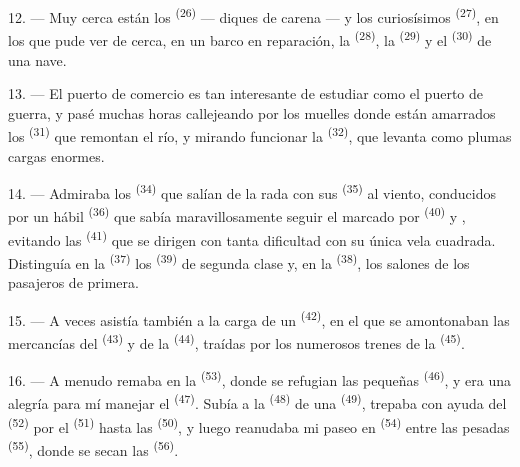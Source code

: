 12. --- Muy cerca están los  \textsuperscript{(26)} --- diques de
carena --- y los curiosísimos  \textsuperscript{(27)}, en
los que pude ver de cerca, en un barco en reparación, la 
\textsuperscript{(28)}, la  \textsuperscript{(29)} y el 
\textsuperscript{(30)} de una nave.

13. --- El puerto de comercio es tan interesante de estudiar como el
puerto de guerra, y pasé muchas horas callejeando por los muelles donde
están amarrados los  \textsuperscript{(31)} que remontan el
río, y mirando funcionar la  \textsuperscript{(32)}, que
levanta como plumas cargas enormes.

\VUsaut{4.0mm}
\VUsaut{3.0mm}

14. --- Admiraba los  \textsuperscript{(34)} que salían de la
rada con sus  \textsuperscript{(35)} al viento, conducidos por un
hábil  \textsuperscript{(36)} que sabía maravillosamente seguir el
 marcado por  \textsuperscript{(40)} y ,
evitando las  \textsuperscript{(41)} que se dirigen con tanta
dificultad con su única vela cuadrada. Distinguía en la 
\textsuperscript{(37)} los  \textsuperscript{(39)} de segunda clase y, en la
 \textsuperscript{(38)}, los salones de los pasajeros de primera.

15. --- A veces asistía también a la carga de un 
\textsuperscript{(42)}, en el que se amontonaban las mercancías del
 \textsuperscript{(43)} y de la 
\textsuperscript{(44)}, traídas por los numerosos trenes de la  \textsuperscript{(45)}.

\VUsaut{3.0mm}
\VUsaut{3.0mm}

16. --- A menudo remaba en la  \textsuperscript{(53)}, donde
se refugian las pequeñas  \textsuperscript{(46)}, y era una
alegría para mí manejar el  \textsuperscript{(47)}. Subía a la
 \textsuperscript{(48)} de una  \textsuperscript{(49)},
trepaba con ayuda del  \textsuperscript{(52)} por el
 \textsuperscript{(51)} hasta las 
\textsuperscript{(50)}, y luego
reanudaba mi paseo en  \textsuperscript{(54)} entre las pesadas
 \textsuperscript{(55)}, donde se secan las 
\textsuperscript{(56)}.

